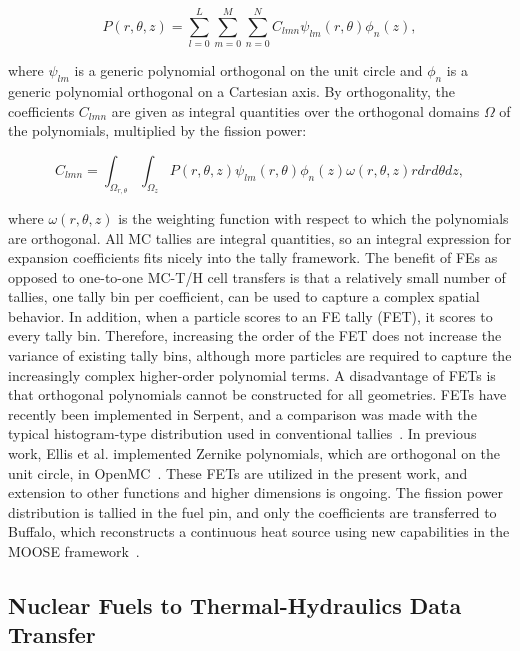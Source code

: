 \documentclass[letterpaper]{physor2018}
\begin{document}
\begin{equation}
P(r,\theta,z)=\sum_{l=0}^L\sum_{m=0}^M\sum_{n=0}^NC_{lmn}\psi_{lm}(r,\theta)\phi_n(z),
\end{equation}

where \(\psi_{lm}\) is a generic polynomial orthogonal on the unit circle
and \(\phi_n\) is a generic polynomial orthogonal on a Cartesian axis.
By orthogonality, the coefficients \(C_{lmn}\) are given as integral
quantities over the orthogonal domains \(\Omega\)
of the polynomials, multiplied by the fission power:

\begin{equation}
C_{lmn}=\int_{\Omega_{r,\theta}}\int_{\Omega_z}P(r,\theta,z)\psi_{lm}(r,\theta)\phi_n(z)\omega(r,\theta,z)rdrd\theta dz,
\end{equation}

where \(\omega(r,\theta,z)\) is the weighting function with respect to which the polynomials
are orthogonal. All MC tallies are integral
quantities, so an integral expression for expansion coefficients fits nicely into
the tally framework.
The benefit of FEs as opposed to one-to-one MC-T/H cell transfers
is that a relatively small number of tallies, one tally bin per coefficient,
can be used to capture a complex spatial behavior. In addition, when a particle
scores to an FE tally (FET), it scores to every tally bin. Therefore, increasing the order of the
FET does not increase the variance of existing tally bins,
although more particles are required to capture the increasingly complex
higher-order polynomial terms. A disadvantage of FETs is that orthogonal
polynomials cannot be constructed for all geometries.
FETs have recently been implemented in Serpent, and a comparison
was made with the typical histogram-type distribution used in
conventional tallies~\cite{Kerby}.
In previous work, Ellis et al. implemented Zernike polynomials, which are orthogonal on the unit circle,
in OpenMC~\cite{Ellis}. These FETs are utilized in the present work, and extension to
other functions and higher dimensions is ongoing.
The fission power distribution is tallied in the fuel pin, and only the
coefficients are transferred to Buffalo, which reconstructs a
continuous heat source using new capabilities
in the MOOSE framework~\cite{Wendt}.

\subsection{Nuclear Fuels to Thermal-Hydraulics Data Transfer}
\label{sec:FuelstoCFD}
\end{document}
